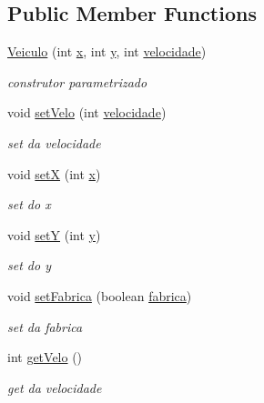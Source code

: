 \subsection*{Public Member Functions}
\begin{DoxyCompactItemize}
\item 
\mbox{\hyperlink{class_veiculo_aa4854ce911d37f725ce5374c1dee62af}{Veiculo}} (int \mbox{\hyperlink{class_veiculo_a069917a284297fe5b385258b2afd9ad6}{x}}, int \mbox{\hyperlink{class_veiculo_af25046404db7c2786c0d9e468bb1fb64}{y}}, int \mbox{\hyperlink{class_veiculo_a2edf5e3132b1c2504c441dc095dc7e0e}{velocidade}})
\begin{DoxyCompactList}\small\item\em construtor parametrizado \end{DoxyCompactList}\item 
void \mbox{\hyperlink{class_veiculo_a7c9b89bb072fedf9c24d1586ec31101b}{set\+Velo}} (int \mbox{\hyperlink{class_veiculo_a2edf5e3132b1c2504c441dc095dc7e0e}{velocidade}})
\begin{DoxyCompactList}\small\item\em set da velocidade \end{DoxyCompactList}\item 
void \mbox{\hyperlink{class_veiculo_a84b2207a013e6cd869959b73a93864b8}{setX}} (int \mbox{\hyperlink{class_veiculo_a069917a284297fe5b385258b2afd9ad6}{x}})
\begin{DoxyCompactList}\small\item\em set do x \end{DoxyCompactList}\item 
void \mbox{\hyperlink{class_veiculo_a57cb54424b47643d8b388c72dbaf43b1}{setY}} (int \mbox{\hyperlink{class_veiculo_af25046404db7c2786c0d9e468bb1fb64}{y}})
\begin{DoxyCompactList}\small\item\em set do y \end{DoxyCompactList}\item 
void \mbox{\hyperlink{class_veiculo_ae9a07a54a5824a9e8cace2c742034956}{set\+Fabrica}} (boolean \mbox{\hyperlink{class_veiculo_a23d377a69bdf558ebedb5bc35dcdebf5}{fabrica}})
\begin{DoxyCompactList}\small\item\em set da fabrica \end{DoxyCompactList}\item 
int \mbox{\hyperlink{class_veiculo_aed4b192929f7efd2234059f139bb29df}{get\+Velo}} ()
\begin{DoxyCompactList}\small\item\em get da velocidade \end{DoxyCompactList}\item 

\end{DoxyCompactItemize}
